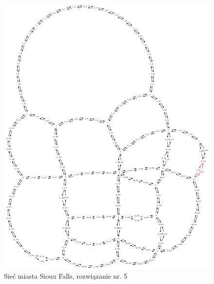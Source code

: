 \documentclass[twoside,12pt]{report}
\begin{document}
\begin{figure}[ht]
\centering
\includegraphics[totalheight=0.580\textheight, angle=90]{img/sioux-out/5/network2}
\caption{Sieć miasta Sioux Falls, rozwiązanie nr. 5}
\label{sioux5}
\end{figure}
\end{document}
